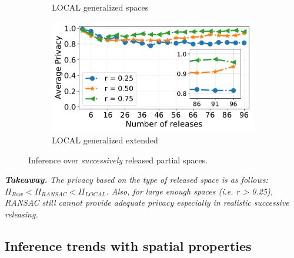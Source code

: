 \begin{figure}[t!]
\begin{subfigure}[]{0.49\columnwidth}
		\caption{LOCAL generalized spaces}
		\label{fig:successive-local-20}
	\end{subfigure}
	\begin{subfigure}[]{0.49\columnwidth}
		\centering
		\includegraphics[width=\textwidth]{figures/plots/2-successive-local-extended-ranked}
    	\caption{\centering LOCAL generalized extended}
		\label{fig:successive-local-100}
	\end{subfigure}
	\caption{Inference over \textit{successively} released partial spaces.}
	\label{fig:partial-results}
	\vspace{-2mm}
\end{figure}

\emph{\textbf{Takeaway.}} \textit{The privacy based on the type of released space is as follows: $\Pi_{Raw} < \Pi_{RANSAC} < \Pi_{LOCAL}$. Also, for large enough spaces (i.e. r > 0.25), RANSAC still cannot provide adequate privacy especially in realistic successive releasing.}

\subsection{Inference trends with spatial properties}

